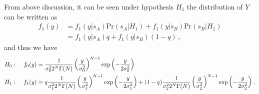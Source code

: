 From above discussion, it can be seen under hypothesis $H_1$ the distribution of $Y$ can be written as
\begin{equation}
  \begin{split}
    f_1(y) &= f_1(y|s_A)\text{Pr}(s_A|H_1) + f_1(y|s_B)\text{Pr}(s_B|H_1)\\
         &= f_1(y|s_A)q + f_1(y|s_B)(1-q)\,,
\end{split}
  \label{20150621a7}
\end{equation}
and thus we have
\begin{equation}
  \begin{split}
    H_0:\;\;\;\;\;&f_0(y) = \CHISQUY[\sigma_0^2]\\
    H_1:\;\;\;\;\;&f_1(y) = q\CHISQUY[\sigma_1^2] + (1-q)\CHISQUY[\sigma_2^2]\,.
  \end{split}
  \label{20150621a81}
\end{equation}

